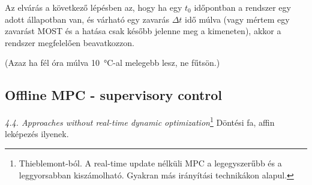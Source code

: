 Az elvárás a következő lépésben az, hogy ha egy $t_0$ időpontban a rendszer egy adott állapotban van, és várható egy zavarás $\Delta t$ idő múlva (vagy mértem egy zavarást MOST és a hatása csak később jelenne meg a kimeneten), akkor a rendszer megfelelően beavatkozzon.

(Azaz ha fél óra múlva \SI{10}{\celsius}-al melegebb lesz, ne fűtsön.)

\subsection{Offline MPC - supervisory control}

\textit{4.4. Approaches without real-time dynamic optimization}\footnote{Thieblemont-ból. A real-time update nélküli MPC a legegyszerűbb és a leggyorsabban kiszámolható. Gyakran más irányítási technikákon alapul.} Döntési fa, affin leképezés ilyenek.